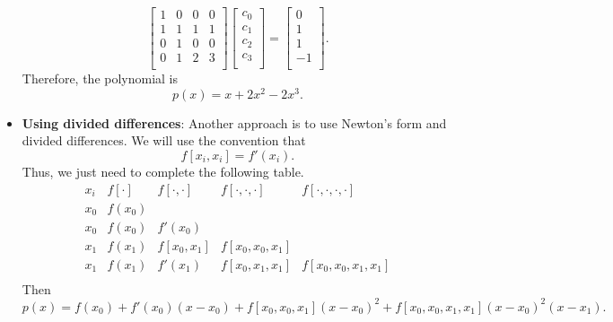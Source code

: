 \documentclass{report}
\begin{document}
\begin{itemize}
    $$
    \begin{bmatrix}
        1 & 0 & 0 &   0 \\
        1 & 1 & 1 &   1 \\
        0 &   1 & 0 & 0 \\
        0 &   1 & 2 & 3 \\
    \end{bmatrix}
    \begin{bmatrix}
        c_0\\c_1\\c_2\\c_3\\
    \end{bmatrix}
    =
    \begin{bmatrix}
        0\\1\\1\\-1\\
    \end{bmatrix}.
    $$
    \bigbreak \noindent 
    Therefore, the polynomial is
$$p(x) = x + 2x^2 - 2x^3.$$
\bigbreak \noindent 
\item \textbf{Using divided differences}:
    Another approach is to use Newton's form and divided differences.
    \bigbreak \noindent 
    We will use the convention that 
    $$f[x_i,x_i] = f'(x_i).$$
    Thus, we just need to complete the following table.
    $$
    \begin{array}{c|cccc}
        x_i & f[\cdot] & f[\cdot,\cdot] & f[\cdot,\cdot,\cdot] & f[\cdot,\cdot,\cdot,\cdot]\\ 
        \hline
        x_0 & f(x_0) & & \\
        x_0 & f(x_0) & f'(x_0) & \\
        x_1 & f(x_1) & f[x_0,x_1] & f[x_0,x_0,x_1] \\
        x_1 & f(x_1) & f'(x_1) & f[x_0,x_1,x_1] & f[x_0,x_0,x_1,x_1] \\
    \end{array}
    $$
    Then 
    $$p(x) = f(x_0) + f'(x_0)(x-x_0) + f[x_0,x_0,x_1](x-x_0)^2 + f[x_0,x_0,x_1,x_1](x-x_0)^2(x-x_1).$$





    \end{itemize}

    \pagebreak 
\end{document}
